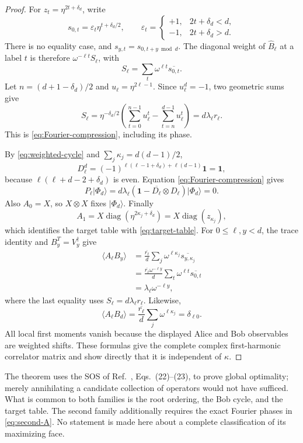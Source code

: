 \documentclass[11pt]{article}
\theoremstyle{definition}
\theoremstyle{remark}
\newcommand{\Id}{\mathbf 1}
\begin{document}
\begin{proof}
For \(z_t=\eta^{2t+\delta_d}\), write
\[
 s_{0,t}=\varepsilon_t\eta^{t+\delta_d/2},
 \qquad
 \varepsilon_t=\begin{cases}
 +1,&2t+\delta_d<d,\\
 -1,&2t+\delta_d>d.
 \end{cases}
\]
There is no equality case, and
\(s_{y,t}=s_{0,t+y\bmod d}\).  The diagonal weight of
\(\widehat B_\ell\) at a
label \(t\) is therefore \(\omega^{-\ell t}S_\ell\), with
\[
 S_\ell=\sum_t\omega^{\ell t}\overline{s_{0,t}}.
\]
Let \(n=(d+1-\delta_d)/2\) and \(u_\ell=\eta^{2\ell-1}\).  Since
\(u_\ell^d=-1\), two geometric sums give
\[
 S_\ell
 =\eta^{-\delta_d/2}
 \left(\sum_{t=0}^{n-1}u_\ell^t-\sum_{t=n}^{d-1}u_\ell^t\right)
 =d\lambda_\ell r_\ell.
\]
This is \eqref{eq:Fourier-compression}, including its phase.

By \eqref{eq:weighted-cycle} and
\(\sum_j\kappa_j=d(d-1)/2\),
\[
 D_\ell^d
 =(-1)^{\ell(\ell-1+\delta_d)+\ell(d-1)}\Id=\Id,
\]
because \(\ell(\ell+d-2+\delta_d)\) is even.  Equation
\eqref{eq:Fourier-compression} gives
\[
 P_\ell\lvert\Phi_d\rangle
 =d\lambda_\ell
 (\Id-\overline{D_\ell}\otimes D_\ell)\lvert\Phi_d\rangle=0.
\]
Also \(A_0=X\), so \(X\otimes X\) fixes \(\lvert\Phi_d\rangle\).
Finally
\[
 A_1=X\operatorname{diag}(\eta^{2\kappa_j+\delta_d})
 =X\operatorname{diag}(z_{\kappa_j}),
\]
which identifies the target table with \eqref{eq:target-table}.  For
\(0\leq\ell,y<d\), the trace identity and \(B_y^T=V_y^\dagger\) give
\begin{align*}
 \langle A_\ell B_y\rangle
 &=\frac{\overline{r_\ell}}d
   \sum_j\omega^{\ell\kappa_j}
   \overline{s_{y,\kappa_j}}\\
 &=\frac{\overline{r_\ell}\omega^{-\ell y}}d
   \sum_t\omega^{\ell t}\overline{s_{0,t}}\\
 &=\lambda_\ell\omega^{-\ell y},
\end{align*}
where the last equality uses \(S_\ell=d\lambda_\ell r_\ell\).  Likewise,
\[
 \langle A_\ell B_d\rangle
 =\frac{\overline{r_\ell}}d
  \sum_j\omega^{\ell\kappa_j}
 =\delta_{\ell0}.
\]
All local first moments vanish because the displayed Alice and Bob
observables are weighted shifts.  These formulas give the complete complex
first-harmonic correlator matrix and show directly that it is independent of
\(\kappa\).
\end{proof}

The theorem uses the SOS of Ref.~\cite{PeritoEtAl2026}, Eqs.~(22)--(23), to
prove global optimality; merely annihilating a candidate collection of
operators would not have sufficed.
What is common to both families is the root ordering, the Bob cycle, and the
target table.  The second family additionally requires the exact Fourier
phases in \eqref{eq:second-A}.  No statement is made here about a complete
classification of its maximizing face.
\end{document}
